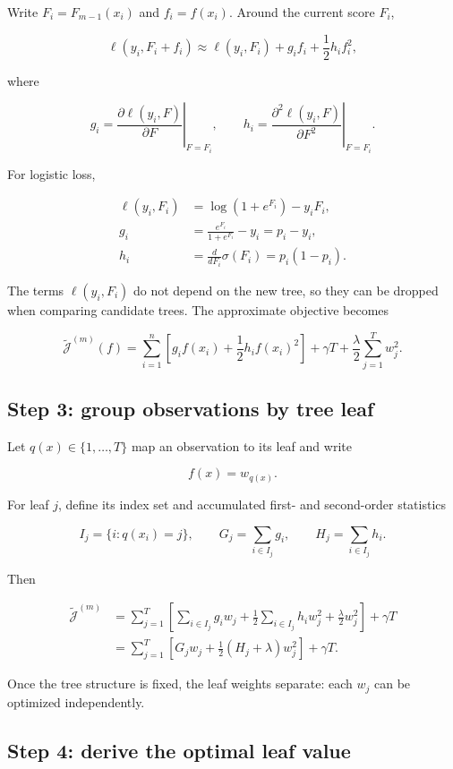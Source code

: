 \documentclass[11pt]{article}
\begin{document}
Write $F_i=F_{m-1}(x_i)$ and $f_i=f(x_i)$. Around the current score $F_i$,

\[
 \ell(y_i,F_i+f_i)
 \approx
 \ell(y_i,F_i)+g_i f_i+\frac12 h_i f_i^2,
\]

where

\[
 g_i=\left.\frac{\partial\ell(y_i,F)}{\partial F}\right|_{F=F_i},
 \qquad
 h_i=\left.\frac{\partial^2\ell(y_i,F)}{\partial F^2}\right|_{F=F_i}.
\]

For logistic loss,

\begin{align*}
 \ell(y_i,F_i)
 &=\log(1+e^{F_i})-y_iF_i,\\
 g_i
 &=\frac{e^{F_i}}{1+e^{F_i}}-y_i
 =p_i-y_i,\\
 h_i
 &=\frac{d}{dF_i}\sigma(F_i)
 =p_i(1-p_i).
\end{align*}

The terms $\ell(y_i,F_i)$ do not depend on the new tree, so they can be dropped
when comparing candidate trees. The approximate objective becomes

\[
 \widetilde{\mathcal J}^{(m)}(f)
 =\sum_{i=1}^n
 \left[g_i f(x_i)+\frac12h_i f(x_i)^2\right]
 +\gamma T+\frac\lambda2\sum_{j=1}^T w_j^2.
\]

\subsection{Step 3: group observations by tree leaf}

Let $q(x)\in\{1,\ldots,T\}$ map an observation to its leaf and write

\[
 f(x)=w_{q(x)}.
\]

For leaf $j$, define its index set and accumulated first- and second-order
statistics

\[
 I_j=\{i:q(x_i)=j\},
 \qquad
 G_j=\sum_{i\in I_j}g_i,
 \qquad
 H_j=\sum_{i\in I_j}h_i.
\]

Then

\begin{align*}
\widetilde{\mathcal J}^{(m)}
&=\sum_{j=1}^T
 \left[
 \sum_{i\in I_j}g_i w_j
 +\frac12\sum_{i\in I_j}h_i w_j^2
 +\frac\lambda2w_j^2
 \right]+\gamma T\\
&=\sum_{j=1}^T
 \left[G_jw_j+\frac12(H_j+\lambda)w_j^2\right]
 +\gamma T.
\end{align*}

Once the tree structure is fixed, the leaf weights separate: each $w_j$ can be
optimized independently.

\subsection{Step 4: derive the optimal leaf value}
\end{document}
